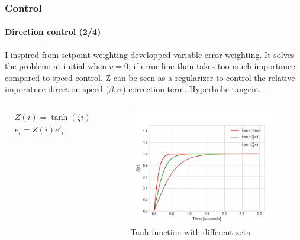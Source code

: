 \documentclass[10pt]{beamer}
\begin{document}
\begin{frame}
\frametitle{Control}
\framesubtitle{Direction control (2/4)}
I inspired from setpoint weighting developped variable error weighting. It solves the problem: at initial when $v=0$, if error line than takes too much importance compared to speed control. Z can be seen as 
a regularizer to control the relative imporatnce direction speed ($\beta, \alpha$) correction term. Hyperbolic tangent.
\begin{columns}[c]

$$
\begin{aligned}
&Z(i) = \tanh(\zeta i)  \\
&e_i = Z(i)e'_i
\end{aligned}
$$

\begin{figure}[hbtp]
\centering
\label{fig:zeta}
\includegraphics[scale=0.4]{figures/zeta.png}
\vspace*{-2mm}
\caption{Tanh function with different zeta}
\end{figure}
\end{columns}
\end{frame}

\end{document}
